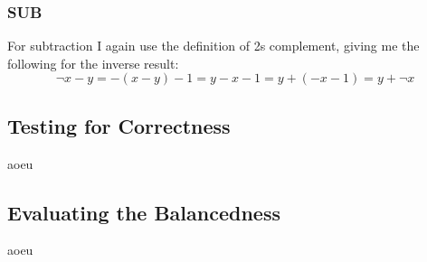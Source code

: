 \subsubsection{SUB}
For subtraction I again use the definition of 2s complement, giving me the following for the inverse result:
\begin{equation*}
  \neg{x-y} = - (x-y) - 1 = y - x - 1 = y + (-x -1) = y + \neg{x}
\end{equation*}



\subsection{Testing for Correctness}
aoeu

\subsection{Evaluating the Balancedness}
\label{balance-eval}
aoeu
